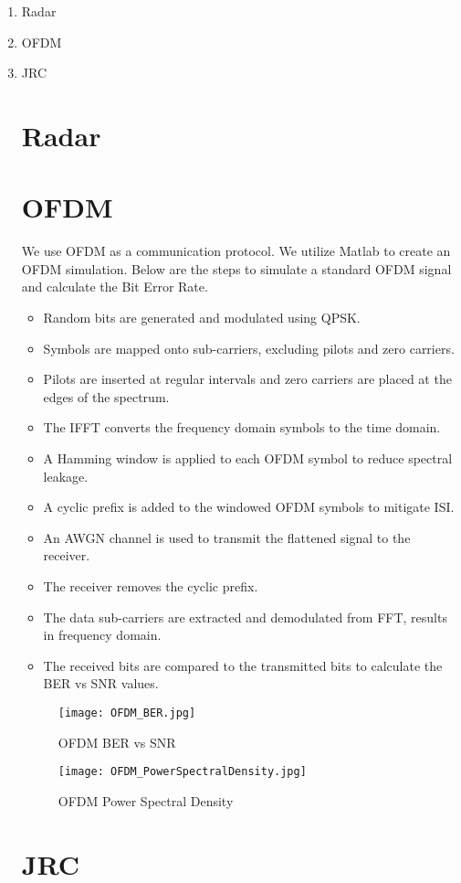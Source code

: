 \documentclass[onecolumn,conference]{IEEEtran}
\begin{document}
	\begin{enumerate}
		\item Radar
          \item OFDM
        \item JRC\par
        
   \section {Radar}

     \section {OFDM}
We use OFDM as a communication protocol. We utilize Matlab to create an OFDM simulation. Below are the steps to simulate a standard OFDM signal and calculate the Bit Error Rate.
\begin{itemize}
\item Random bits are generated and modulated using QPSK. 
\item Symbols are mapped onto sub-carriers, excluding pilots and zero carriers.
\item Pilots are inserted at regular intervals and zero carriers are placed at the edges of the spectrum.
\item The IFFT converts the frequency domain symbols to the time domain. 
\item A Hamming window is applied to each OFDM symbol to reduce spectral leakage. 
\item A cyclic prefix is added to the windowed OFDM symbols to mitigate ISI. 
\item An AWGN channel is used to transmit the flattened signal to the receiver.\par
\item The receiver removes the cyclic prefix. 
\item The data sub-carriers are extracted and demodulated from FFT, results in frequency domain. 
\item The received bits are compared to the transmitted bits to calculate the BER vs SNR values. 
\end{itemize}

\begin{figure}
    \centering
    \texttt{[image: OFDM\_BER.jpg]}
    \caption{OFDM BER vs SNR}
    \end{figure}
\begin{figure}
        \centering
        \texttt{[image: OFDM\_PowerSpectralDensity.jpg]}
        \caption{OFDM Power Spectral Density}
    \end{figure}
        

  


     \section {JRC}

	\end{enumerate}
	
	\nocite{yang_subcarrier_multiplexing}
	{}
    
  
\end{document}
